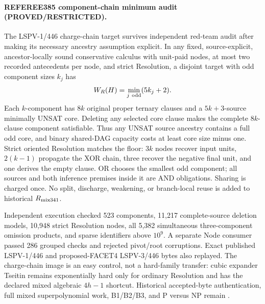 

\paragraph{REFEREE385 component-chain minimum audit (PROVED/RESTRICTED).}
The LSPV-1/446 charge-chain target survives independent red-team audit after
making its necessary ancestry assumption explicit.  In any fixed,
source-explicit, ancestor-locally sound conservative calculus with unit-paid
nodes, at most two recorded antecedents per node, and strict Resolution, a
disjoint target with odd component sizes $k_j$ has
\[
 W_R(H)=\min_{j\ {\rm odd}}(5k_j+2).
\]
Each $k$-component has $8k$ original proper ternary clauses and a
$5k+3$-source minimally UNSAT core.  Deleting any selected core clause makes
the complete $8k$-clause component satisfiable.  Thus any UNSAT source ancestry
contains a full odd core, and binary shared-DAG capacity costs at least core
size minus one.  Strict oriented Resolution matches the floor: $3k$ nodes
recover input units, $2(k-1)$ propagate the XOR chain, three recover the
negative final unit, and one derives the empty clause.  OR chooses the smallest
odd component; all sources and both inference premises inside it are AND
obligations.  Sharing is charged once.  No split, discharge, weakening, or
branch-local reuse is added to historical $R_{\rm mix341}$.

Independent execution checked 523 components, 11,217 complete-source deletion
models, 10,948 strict Resolution nodes, all 5,382 simultaneous three-component
omission products, and sparse identifiers above $10^9$.  A separate Node
consumer passed 286 grouped checks and rejected pivot/root corruptions.  Exact
published LSPV-1/446 and proposed-FACET4 LSPV-3/446 bytes also replayed.  The
charge-chain image is an easy control, not a hard-family transfer: cubic
expander Tseitin remains exponentially hard only for ordinary Resolution and
has the declared mixed algebraic $4h-1$ shortcut.  Historical accepted-byte
authentication, full mixed superpolynomial work, B1/B2/B3, and P versus NP
remain \OPEN.
